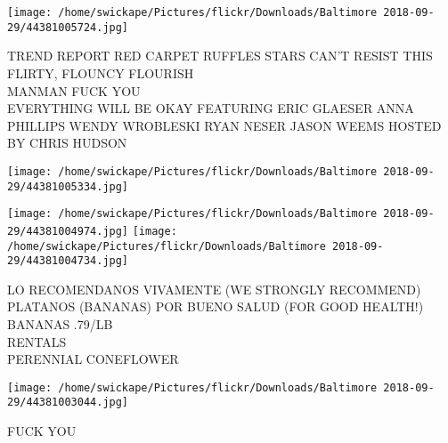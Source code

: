\documentclass[10pt,letterpaper]{article}
\begin{document}
\texttt{[image: /home/swickape/Pictures/flickr/Downloads/Baltimore 2018-09-29/44381005724.jpg]}

TREND REPORT RED CARPET RUFFLES STARS CAN'T RESIST THIS FLIRTY, FLOUNCY FLOURISH\\
MANMAN FUCK YOU\\
EVERYTHING WILL BE OKAY FEATURING ERIC GLAESER ANNA PHILLIPS WENDY WROBLESKI RYAN NESER JASON WEEMS HOSTED BY CHRIS HUDSON\\
\pagebreak

\texttt{[image: /home/swickape/Pictures/flickr/Downloads/Baltimore 2018-09-29/44381005334.jpg]}

\vspace{0.25in}
\texttt{[image: /home/swickape/Pictures/flickr/Downloads/Baltimore 2018-09-29/44381004974.jpg]}
\texttt{[image: /home/swickape/Pictures/flickr/Downloads/Baltimore 2018-09-29/44381004734.jpg]}

LO RECOMENDANOS VIVAMENTE (WE STRONGLY RECOMMEND) PLATANOS (BANANAS) POR BUENO SALUD (FOR GOOD HEALTH!) BANANAS .79/LB\\
RENTALS\\
PERENNIAL CONEFLOWER\\
\pagebreak

\texttt{[image: /home/swickape/Pictures/flickr/Downloads/Baltimore 2018-09-29/44381003044.jpg]}

FUCK YOU\\
\pagebreak
\end{document}
